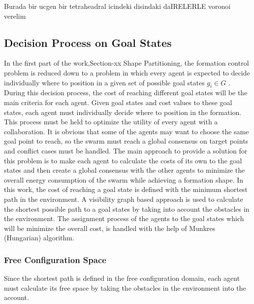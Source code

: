 \documentclass[twoside]{article}
\begin{document}
	Burada bir ucgen bir tetraheadral icindeki disindaki daIRELERLE  voronoi verelim
	
	
	
		\subsection{Decision Process on Goal States}
	In the first part of the work,Section-xx Shape Partitioning, the formation control problem is reduced down to a problem in which every agent is expected to decide individually where to position in a given set of possible goal states $g_i \in G$ .  During this decision process, the cost of reaching different goal states will be the main criteria for each agent. Given goal states and cost values to these goal states, each agent must individually  decide where to position in the formation. This process must be held to optimize the utility of every agent with a collaboration. It is obvious that some of the agents may want to choose the same goal point to reach, so the swarm must reach a global consensus on target points and conflict cases must be handled. The main approach to provide a solution for this problem is to make each agent to calculate the costs of its own to the goal states and then create a global consensus with the other agents to minimize the overall energy consumption of the swarm while achieving a formation shape. 
	In this work, the cost of reaching a goal state is defined with the minimum shortest path in the environment. A visibility graph based approach is used to calculate the shortest possible path to a goal states by taking into account the obstacles in the environment. The assignment process of the agents to the goal states which will be minimize the overall cost, is handled with the help of Munkres (Hungarian)  algorithm.
	
	\subsubsection{Free Configuration Space}
		Since the shortest path is defined in the free configuration domain, each agent must calculate its free space by taking the obstacles in the environment into the account. 
\end{document}
